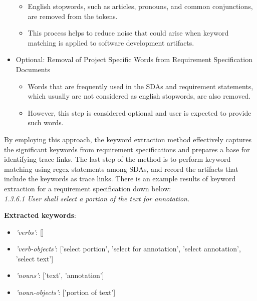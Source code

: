 \begin{itemize}
        \begin{itemize}
            \item English stopwords, such as articles, pronouns, and common conjunctions, are removed from the tokens.
            \item This process helps to reduce noise that could arise when keyword matching is applied to software development artifacts.
        \end{itemize}
    \item Optional: Removal of Project Specific Words from Requirement Specification Documents
        \begin{itemize}
            \item Words that are frequently used in the SDAs and requirement statements, which usually are not considered as english stopwords, are also removed.
            \item However, this step is considered optional and user is expected to provide such words.
        \end{itemize}
\end{itemize}

By employing this approach, the keyword extraction method effectively captures the significant keywords from requirement specifications and prepares a base for identifying trace links. The last step of the method is to perform keyword matching using regex statements among SDAs, and record the artifacts that include the keywords as trace links. There is an example results of keyword extraction for a requirement specification down below:\\

\textit{1.3.6.1 User shall select a portion of the text for annotation.}

\textbf{Extracted keywords}: 
\begin{itemize}
    \item \textit{'verbs'}: []
    \item \textit{'verb-objects'}: ['select portion', 'select for annotation', 'select annotation', 'select text']
    \item \textit{'nouns'}: ['text', 'annotation']
    \item  \textit{'noun-objects'}: ['portion of text']\\
\end{itemize}

